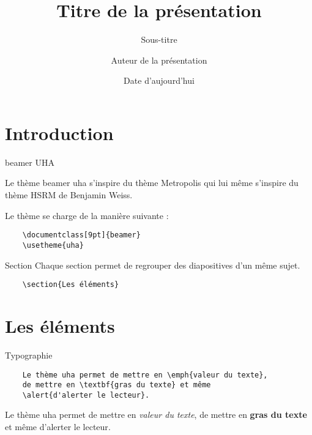 \documentclass[9pt]{beamer}
\title{Titre de la présentation}
\subtitle{Sous-titre}
\date{Date d'aujourd'hui}
\author{Auteur de la présentation}
\institute{Université de Haute Alsace}
\begin{document}
\begin{frame}
	\titlepage
\end{frame}

\section{Introduction}

\begin{frame}[fragile]{beamer UHA}
	
	Le thème beamer uha s'inspire du thème Metropolis qui lui même s'inspire du thème HSRM de Benjamin Weiss.

	Le thème se charge de la manière suivante :

	\begin{verbatim}
	\documentclass[9pt]{beamer}
	\usetheme{uha}
	\end{verbatim}
\end{frame}

\begin{frame}[fragile]{Section}
	Chaque section permet de regrouper des diapositives d'un même sujet.
	\begin{verbatim}
	\section{Les éléments}
	\end{verbatim}
\end{frame}

\section{Les éléments}

\begin{frame}[fragile]{Typographie}
	\begin{verbatim}
	Le thème uha permet de mettre en \emph{valeur du texte}, 
	de mettre en \textbf{gras du texte} et même 
	\alert{d'alerter le lecteur}.
	\end{verbatim}
	Le thème uha permet de mettre en \emph{valeur du texte}, de mettre en \textbf{gras du texte} et même \alert{d'alerter le lecteur}.
\end{frame}
\end{document}
